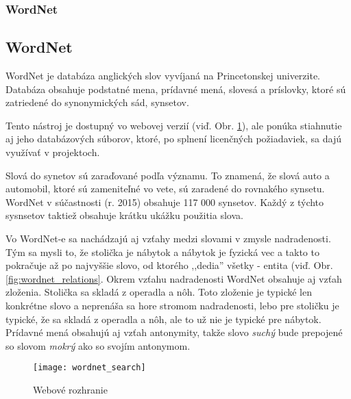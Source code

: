 {
	\subsubsection{WordNet}
}
{
	\subsection{WordNet}
}
\label{subsubsec:wordnet}
WordNet je databáza anglických slov vyvíjaná na Princetonskej univerzite. Databáza obsahuje podstatné mena, prídavné mená, slovesá a príslovky, ktoré sú zatriedené do synonymických sád, synsetov.

Tento nástroj je dostupný vo webovej verzií (viď. Obr. \ref{fig:wordnet_search}), ale ponúka stiahnutie aj jeho databázových súborov, ktoré, po splnení licenčných požiadaviek, sa dajú využívať v projektoch.

Slová do synetov sú zaraďované podľa významu. To znamená, že slová auto a automobil, ktoré sú zameniteľné vo vete, sú zaradené do rovnakého synsetu. WordNet v súčastnosti (r. 2015) obsahuje 117 000 synsetov. Každý z týchto sysnsetov taktiež obsahuje krátku ukážku použitia slova.

Vo WordNet-e sa nachádzajú aj vzťahy medzi slovami v zmysle nadradenosti. Tým sa mysli to, že stolička je nábytok a nábytok je fyzická vec a takto to pokračuje až po najvyššie slovo, od ktorého ,,dedia'' všetky - entita (viď. Obr.  \ref{fig:wordnet_relations}. Okrem vzťahu nadradenosti WordNet obsahuje aj vzťah zloženia. Stolička sa skladá z operadla a nôh. Toto zloženie je typické len konkrétne slovo a neprenáša sa hore stromom nadradenosti,   lebo pre stoličku je typické, že sa skladá z operadla a nôh, ale to už nie je typické pre nábytok.
Prídavné mená obsahujú aj vzťah antonymity, takže slovo \textit{suchý} bude prepojené so slovom \textit{mokrý} ako so svojím antonymom.

\begin{figure}[H]
\begin{center}\texttt{[image: wordnet\_search]}\end{center}
\caption[Webové rozhranie]{Webové rozhranie}\label{fig:wordnet_search}
\end{figure}

